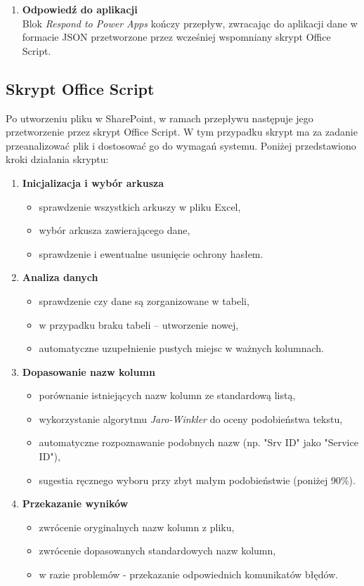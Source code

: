 \begin{enumerate}
    \item \textbf{Odpowiedź do aplikacji} \\
    Blok \textit{Respond to Power Apps} kończy przepływ, zwracając do aplikacji dane w formacie JSON przetworzone przez wcześniej wspomniany skrypt Office Script.
\end{enumerate}

\subsection{Skrypt Office Script}
Po utworzeniu pliku w SharePoint, w ramach przepływu następuje jego przetworzenie przez skrypt Office Script. W tym przypadku skrypt ma za zadanie przeanalizować plik i dostosować go do wymagań systemu. Poniżej przedstawiono kroki działania skryptu:

\begin{enumerate}
    \item \textbf{Inicjalizacja i wybór arkusza}
    \begin{itemize}
        \item sprawdzenie wszystkich arkuszy w pliku Excel,
        \item wybór arkusza zawierającego dane,
        \item sprawdzenie i ewentualne usunięcie ochrony hasłem.
    \end{itemize}

    \item \textbf{Analiza danych}
    \begin{itemize}
        \item sprawdzenie czy dane są zorganizowane w tabeli,
        \item w przypadku braku tabeli -- utworzenie nowej,
        \item automatyczne uzupełnienie pustych miejsc w ważnych kolumnach.
    \end{itemize}

    \item \textbf{Dopasowanie nazw kolumn}
    \begin{itemize}
        \item porównanie istniejących nazw kolumn ze standardową listą,
        \item wykorzystanie algorytmu \emph{Jaro-Winkler} do oceny podobieństwa tekstu,
        \item automatyczne rozpoznawanie podobnych nazw (np. "Srv ID" jako "Service ID"),
        \item sugestia ręcznego wyboru przy zbyt małym podobieństwie (poniżej 90\%).
    \end{itemize}

    \item \textbf{Przekazanie wyników}
    \begin{itemize}
        \item zwrócenie oryginalnych nazw kolumn z pliku,
        \item zwrócenie dopasowanych standardowych nazw kolumn,
        \item w razie problemów - przekazanie odpowiednich komunikatów błędów.
    \end{itemize}
\end{enumerate}


